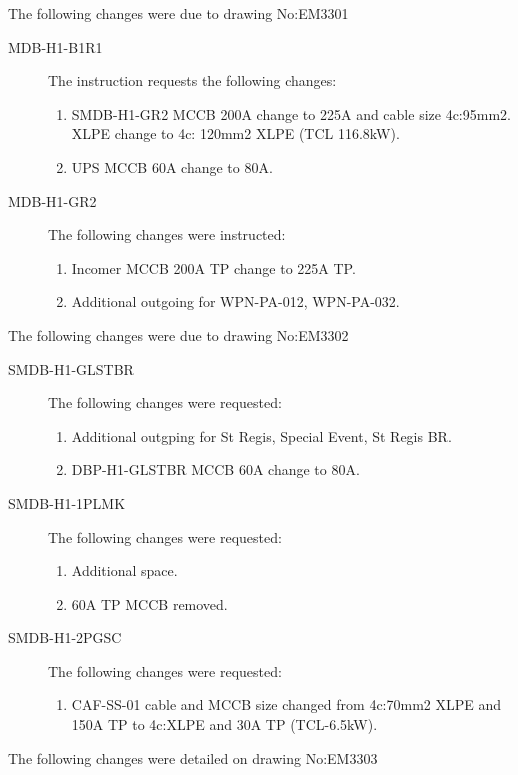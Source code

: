 The following changes were due to drawing No:EM3301

\begin{description}
\item [MDB-H1-B1R1] The instruction requests the following changes:
    \begin{enumerate}
       \item SMDB-H1-GR2 MCCB 200A change to 225A and cable size 4c:95mm2. XLPE change to 4c: 120mm2 XLPE (TCL 116.8kW).
       \item UPS MCCB 60A change to 80A.
    \end{enumerate}
\item[MDB-H1-GR2] The following changes were instructed:
    \begin{enumerate}
       \item Incomer MCCB 200A TP change to 225A TP.
       \item Additional outgoing for WPN-PA-012, WPN-PA-032.
    \end{enumerate}
\end{description}

The following changes were due to drawing No:EM3302

\begin{description}
\item[SMDB-H1-GLSTBR] The following changes were requested:
   \begin{enumerate}
      \item Additional outgping for St Regis, Special Event, St Regis BR.
      \item DBP-H1-GLSTBR MCCB 60A change to 80A.
   \end{enumerate}
\item[SMDB-H1-1PLMK] The following changes were requested:
      \begin{enumerate}
        \item Additional space.
        \item 60A TP MCCB removed.
      \end{enumerate}  
\item[SMDB-H1-2PGSC] The following changes were requested:
     \begin{enumerate}
        \item CAF-SS-01 cable and MCCB size changed from 4c:70mm2 XLPE and 150A TP to 4c:XLPE and 30A TP (TCL-6.5kW).
     \end{enumerate}
\end{description}

The following changes were detailed on drawing No:EM3303

